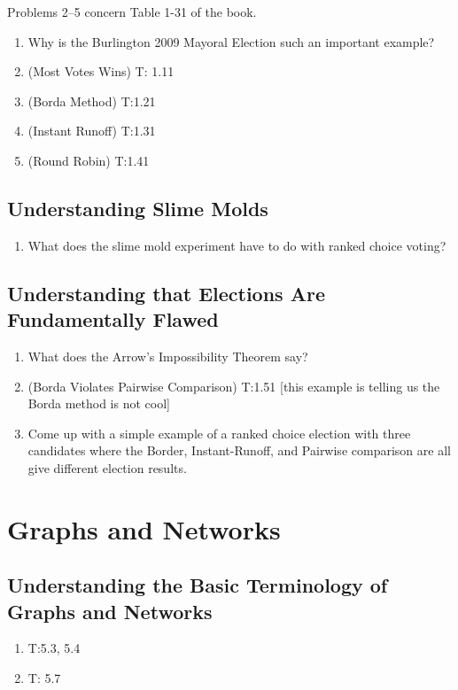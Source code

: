 \documentclass[11pt, letterpaper]{article}
\begin{document}
\noindent Problems 2--5 concern Table 1-31 of the book.
\begin{enumerate}
	\item Why is the Burlington 2009 Mayoral Election such an important example?
	\item (Most Votes Wins) T: 1.11
	\item (Borda Method) T:1.21
	\item (Instant Runoff) T:1.31
	\item (Round Robin) T:1.41
\end{enumerate}

\subsection{Understanding Slime Molds}
\begin{enumerate}
	\item What does the slime mold experiment have to do with ranked choice voting?
\end{enumerate}

\subsection{Understanding that Elections Are Fundamentally Flawed}
\begin{enumerate}
	\item What does the Arrow's Impossibility Theorem say?
	\item (Borda Violates Pairwise Comparison) T:1.51 [this example is telling us the Borda method is not cool]
	\item Come up with a simple example of a ranked choice election with three candidates where the Border, Instant-Runoff, and Pairwise comparison are all give different election results.
\end{enumerate}
\newpage

\newpage

\section{Graphs and Networks}
 
\subsection{Understanding the Basic Terminology of Graphs and Networks}
\begin{enumerate}
	\item T:5.3, 5.4
	\item T: 5.7
\end{enumerate}
\end{document}
